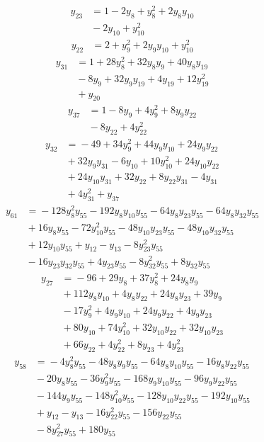 \begin{align*}
y_{23} &={} 1 -2y_{8} +y_{8}^{2} +2y_{8}y_{10} \\
 &{} -2y_{10} +y_{10}^{2}
\end{align*}
\begin{align*}
y_{22} &={} 2 +y_{9}^{2} +2y_{9}y_{10} +y_{10}^{2}
\end{align*}
\begin{align*}
y_{31} &={} 1 +28y_{8}^{2} +32y_{8}y_{9} +40y_{8}y_{19} \\
 &{} -8y_{9} +32y_{9}y_{19} +4y_{19} +12y_{19}^{2} \\
 &{} +y_{20}
\end{align*}
\begin{align*}
y_{37} &={} 1 -8y_{9} +4y_{9}^{2} +8y_{9}y_{22} \\
 &{} -8y_{22} +4y_{22}^{2}
\end{align*}
\begin{align*}
y_{32} &={} -49 +34y_{9}^{2} +44y_{9}y_{10} +24y_{9}y_{22} \\
 &{} +32y_{9}y_{31} -6y_{10} +10y_{10}^{2} +24y_{10}y_{22} \\
 &{} +24y_{10}y_{31} +32y_{22} +8y_{22}y_{31} -4y_{31} \\
 &{} +4y_{31}^{2} +y_{37}
\end{align*}
\begin{align*}
y_{61} &={} -128y_{8}^{2}y_{55} -192y_{8}y_{10}y_{55} -64y_{8}y_{23}y_{55} -64y_{8}y_{32}y_{55} \\
 &{} +16y_{8}y_{55} -72y_{10}^{2}y_{55} -48y_{10}y_{23}y_{55} -48y_{10}y_{32}y_{55} \\
 &{} +12y_{10}y_{55} +y_{12} -y_{13} -8y_{23}^{2}y_{55} \\
 &{} -16y_{23}y_{32}y_{55} +4y_{23}y_{55} -8y_{32}^{2}y_{55} +8y_{32}y_{55}
\end{align*}
\begin{align*}
y_{27} &={} -96 +29y_{8} +37y_{8}^{2} +24y_{8}y_{9} \\
 &{} +112y_{8}y_{10} +4y_{8}y_{22} +24y_{8}y_{23} +39y_{9} \\
 &{} -17y_{9}^{2} +4y_{9}y_{10} +24y_{9}y_{22} +4y_{9}y_{23} \\
 &{} +80y_{10} +74y_{10}^{2} +32y_{10}y_{22} +32y_{10}y_{23} \\
 &{} +66y_{22} +4y_{22}^{2} +8y_{23} +4y_{23}^{2}
\end{align*}
\begin{align*}
y_{58} &={} -4y_{8}^{2}y_{55} -48y_{8}y_{9}y_{55} -64y_{8}y_{10}y_{55} -16y_{8}y_{22}y_{55} \\
 &{} -20y_{8}y_{55} -36y_{9}^{2}y_{55} -168y_{9}y_{10}y_{55} -96y_{9}y_{22}y_{55} \\
 &{} -144y_{9}y_{55} -148y_{10}^{2}y_{55} -128y_{10}y_{22}y_{55} -192y_{10}y_{55} \\
 &{} +y_{12} -y_{13} -16y_{22}^{2}y_{55} -156y_{22}y_{55} \\
 &{} -8y_{27}^{2}y_{55} +180y_{55}
\end{align*}
